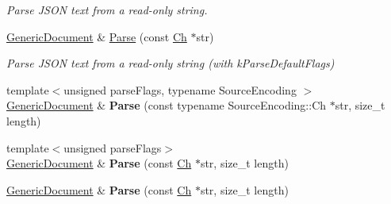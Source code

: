 \begin{Indent}
\begin{DoxyCompactItemize}
\begin{DoxyCompactList}\small\item\em Parse J\+S\+ON text from a read-\/only string. \end{DoxyCompactList}\item 
\hyperlink{classGenericDocument}{Generic\+Document} \& \hyperlink{classGenericDocument_a49ae6de6fd0bc820d9864a106c10b4da}{Parse} (const \hyperlink{classGenericValue_ade0e0ce64ccd5d852da57a35e720bafb}{Ch} $\ast$str)
\begin{DoxyCompactList}\small\item\em Parse J\+S\+ON text from a read-\/only string (with k\+Parse\+Default\+Flags) \end{DoxyCompactList}\item 
\mbox{\label{classGenericDocument_a46b5028cc760c4e915a0d5216af9f7e2}} 
{\footnotesize template$<$unsigned parse\+Flags, typename Source\+Encoding $>$ }\\\hyperlink{classGenericDocument}{Generic\+Document} \& {\bfseries Parse} (const typename Source\+Encoding\+::\+Ch $\ast$str, size\+\_\+t length)
\item 
\mbox{\label{classGenericDocument_a93fec16eacec4f4b42075bb3bc242a6b}} 
{\footnotesize template$<$unsigned parse\+Flags$>$ }\\\hyperlink{classGenericDocument}{Generic\+Document} \& {\bfseries Parse} (const \hyperlink{classGenericValue_ade0e0ce64ccd5d852da57a35e720bafb}{Ch} $\ast$str, size\+\_\+t length)
\item 
\mbox{\label{classGenericDocument_ab13d8358acc0648e3f91f6b825365e4f}} 
\hyperlink{classGenericDocument}{Generic\+Document} \& {\bfseries Parse} (const \hyperlink{classGenericValue_ade0e0ce64ccd5d852da57a35e720bafb}{Ch} $\ast$str, size\+\_\+t length)
\end{DoxyCompactItemize}
\end{Indent}

